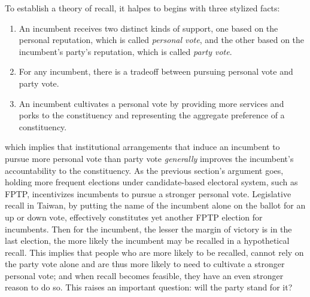 \documentclass[hyphens, crop=false]{standalone}
\begin{document}
	
	
	
	
	
	
	To establish a theory of recall,
	it halpes to begins with
	three stylized facts:
	\begin{enumerate}
		\item
		An incumbent receives
		two distinct kinds of support,
		one based on the personal reputation, which is called \textit{personal vote}, and
		the other based on the incumbent's party's reputation, which is called \textit{party vote}.
		\item
		For any incumbent, there is a tradeoff between pursuing personal vote and party vote.
		\item
		An incumbent cultivates a personal vote
		by providing more services and porks to the constituency and
		representing the aggregate preference of a constituency.
	\end{enumerate}
	which implies that
	institutional arrangements that induce an incumbent to pursue more personal vote than party vote
	\textit{generally} improves the incumbent's accountability to the constituency.
	As the previous section's argument goes,
	holding more frequent elections under candidate-based electoral system,
	such as FPTP,
	incentivizes incumbents to pursue a stronger personal vote.
	Legislative recall in Taiwan,
	by putting the name of the incumbent alone on the ballot for an up or down vote,
	effectively constitutes yet another FPTP election for incumbents.
	Then for the incumbent,
	the lesser the margin of victory is in the last election,
	the more likely the incumbent may be recalled in a hypothetical recall.
	This implies that people who are more likely to be recalled,
	cannot rely on the party vote alone and are thus
	more likely to need to cultivate a stronger personal vote;
	and when recall becomes feasible,
	they have an even stronger reason to do so.
	This raises an important question:
	will the party stand for it?
	
\end{document}
